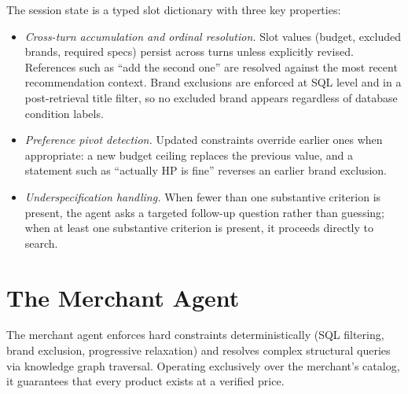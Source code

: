 \documentclass[sigconf,anonymous]{acmart}
\begin{document}
The session state is a typed slot dictionary with three key properties:
\begin{itemize}[leftmargin=*]
\item \emph{Cross-turn accumulation and ordinal resolution.}
  Slot values (budget, excluded brands, required specs) persist across turns
  unless explicitly revised. References such as ``add the second one'' are
  resolved against the most recent recommendation context. Brand exclusions
  are enforced at SQL level and in a post-retrieval title filter, so no
  excluded brand appears regardless of database condition labels.
\item \emph{Preference pivot detection.}
  Updated constraints override earlier ones when appropriate: a new budget
  ceiling replaces the previous value, and a statement such as ``actually HP
  is fine'' reverses an earlier brand exclusion.
\item \emph{Underspecification handling.}
  When fewer than one substantive criterion is present, the agent asks a
  targeted follow-up question rather than guessing; when at least one
  substantive criterion is present, it proceeds directly to search.
\end{itemize}




\section{The Merchant Agent}
\label{sec:merchant-agent}

The merchant agent enforces hard constraints deterministically (SQL filtering,
brand exclusion, progressive relaxation) and resolves complex structural
queries via knowledge graph traversal. Operating exclusively over the
merchant's catalog, it guarantees that every product exists at a verified
price. %
\end{document}
